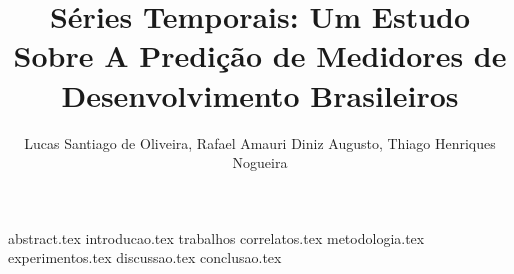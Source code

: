 \documentclass{article}
\title{Séries Temporais: Um Estudo Sobre A Predição de Medidores de Desenvolvimento Brasileiros}
\author{Lucas Santiago de Oliveira\inst{1}, Rafael Amauri Diniz Augusto\inst{1}, Thiago Henriques Nogueira\inst{1}}
\begin{document}
  \maketitle

  {abstract.tex}
  {introducao.tex}
  {trabalhos correlatos.tex}
  {metodologia.tex}
  {experimentos.tex}
  {discussao.tex}
  {conclusao.tex}

  
  
\end{document}
